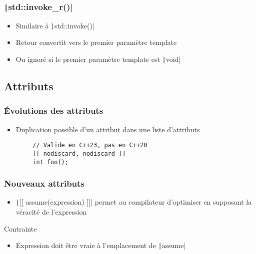 \documentclass[C++.tex]{subfiles}
\begin{document}
\begin{frame}[fragile]
	\frametitle{\texttt|std::invoke_r()|}
	\begin{itemize}
		\item Similaire à \texttt|std::invoke()|
		\item Retour convertit vers le premier paramètre template
		\item Ou ignoré si le premier paramètre template est \texttt|void|
	\end{itemize}

\end{frame}

\subsection*{Attributs}
\begin{frame}[fragile]
	\frametitle{Évolutions des attributs}
	\begin{itemize}
		\item Duplication possible d'un attribut dans une liste d'attributs
	\end{itemize}

	\begin{verbatim}
		// Valide en C++23, pas en C++20
		[[ nodiscard, nodiscard ]]
		int foo();
	\end{verbatim}

\end{frame}

\begin{frame}[fragile]
	\frametitle{Nouveaux attributs}
	\begin{itemize}
		\item \texttt|[[ assume(expression) ]]| permet au compilateur d'optimiser en supposant la véracité de l'expression
	\end{itemize}

	\begin{alertblock}{Contrainte}
		\begin{itemize}
			\item Expression doit être vraie à l'emplacement de \texttt|assume|

		\end{itemize}
	\end{alertblock}

\end{frame}
\end{document}
